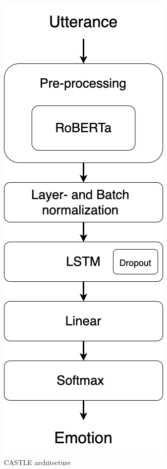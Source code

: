 \documentclass[nofilelist]{cslthse-msc}
\begin{document}
\begin{figure}[!ht]
    \centering
    \includegraphics[scale=0.3]{msccls/explanatory_images/CASTLE_arch.png}
    \caption{CASTLE architecture}
    \label{fig:CASTLE_arch}
\end{figure}
\end{document}
